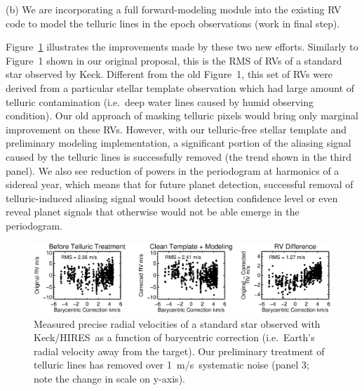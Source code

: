 \documentclass[12pt]{article}
\def\mps{m/s}
\def\keck{Keck/HIRES}
\begin{document}
(b) We are incorporating a full forward-modeling module into the
existing RV code to model the telluric lines in the epoch
observations (work in final step).

Figure~\ref{fig:tell} illustrates the improvements made by these two
new efforts. Similarly to Figure~1 shown in our original proposal,
this is the RMS of RVs of a standard star observed by Keck. Different
from the old Figure~1, this set of RVs were derived from a particular
stellar template observation which had large amount of telluric
contamination (i.e.\ deep water lines caused by humid observing
condition). Our old approach of masking telluric pixels would bring
only marginal improvement on these RVs. However, with our
telluric-free stellar template and preliminary modeling
implementation, a significant portion of the aliasing signal caused by
the telluric lines is successfully removed (the trend shown in the
third panel). We also see reduction of powers in the periodogram at
harmonics of a sidereal year, which means that for future planet
detection, successful removal of telluric-induced aliasing signal
would boost detection confidence level or even reveal planet signals
that otherwise would not be able emerge in the periodogram.

\begin{figure}[thb]
  \vspace{-3pt}
  \begin{center}
    \includegraphics[width=\textwidth]{185144_BC_RV_rj172_4panel}
  \end{center}
  \vspace{-25pt}  
  \caption{Measured precise radial velocities of a standard star
    observed with \keck\ as a function of barycentric correction
    (i.e.~Earth's radial velocity away from the target). Our
    preliminary treatment of telluric lines has removed over
    1~\mps\ systematic noise (panel 3; note the change in scale on
    y-axis).} 
  \vspace{-8pt}  
  \label{fig:tell}
\end{figure}
\end{document}
